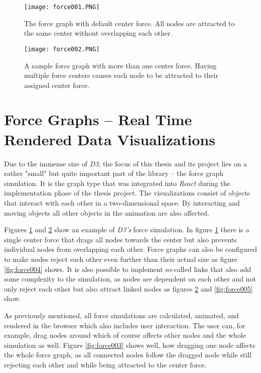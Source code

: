 
\begin{figure}
  \centering
  \texttt{[image: force001.PNG]}
  \caption{The force graph with default center force. All nodes are attracted to the same center without overlapping each other.}
  \label{fig:force001}
\end{figure}

\begin{figure}
  \centering
  \texttt{[image: force002.PNG]}
  \caption{A sample force graph with more than one center force. Having multiple force centers causes each node to be attracted to their assigned center force.}
  \label{fig:force002}
\end{figure}

\section{Force Graphs -- Real Time Rendered Data Visualizations}

Due to the immense size of \emph{D3}, the focus of this thesis and its project lies on a rather "small" but quite important part of the library -- the force graph simulation. It is the graph type that was integrated into \emph{React} during the implementation phase of the thesis project. The visualizations consist of objects that interact with each other in a two-dimensional space. By interacting and moving objects all other objects in the animation are also affected. 

Figures \ref{fig:force001} and \ref{fig:force002} show an example of \emph{D3's} force simulation. In figure \ref{fig:force001} there is a single center force that drags all nodes towards the center but also prevents individual nodes from overlapping each other. Force graphs can also be configured to make nodes reject each other even further than their actual size as figure \ref{fig:force004} shows. It is also possible to implement so-called links that also add some complexity to the simulation, as nodes are dependent on each other and not only reject each other but also attract linked nodes as figures \ref{fig:force002} and \ref{fig:force005} show.

As previously mentioned, all force simulations are calculated, animated, and rendered in the browser which also includes user interaction. The user can, for example, drag nodes around which of course affects other nodes and the whole simulation as well. Figure \ref{fig:force003} shows well, how dragging one node affects the whole force graph, as all connected nodes follow the dragged node while still rejecting each other and while being attracted to the center force.

